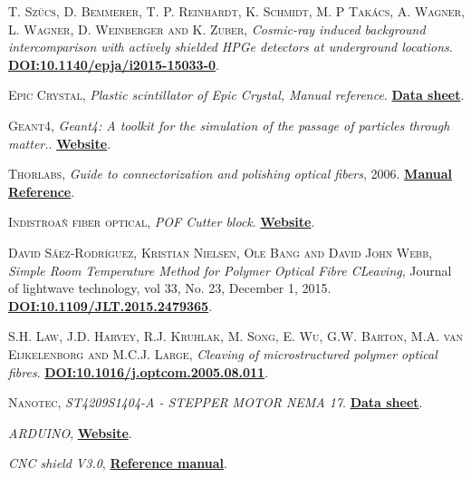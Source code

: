 \begin{thebibliography}{100}
 \textsc{T. Szücs, D. Bemmerer, T. P. Reinhardt, K. Schmidt, M. P Takács, A. Wagner, L. Wagner, D. Weinberger and K. Zuber},
\textit{Cosmic-ray induced background intercomparison with actively shielded HPGe detectors at underground locations}. \href{https://arxiv.org/abs/1503.00457v2}{\textbf{DOI:10.1140/epja/i2015-15033-0}}.

 \textsc{Epic Crystal},
\textit{Plastic scintillator of Epic Crystal, Manual reference}. \href{http://www.epic-crystal.com/others/plastic-scintillator.html}{\textbf{Data sheet}}.

 \textsc{Geant4},
\textit{Geant4: A toolkit for the simulation of the passage of particles through matter.}. \href{https://geant4.web.cern.ch/node/1}{\textbf{Website}}.

 \textsc{Thorlabs},
\textit{Guide to connectorization and polishing optical fibers}, 2006. \href{https://www.thorlabs.de/thorproduct.cfm?partnumber=FN96A}{\textbf{Manual Reference}}.

 \textsc{Indistroañ fiber optical},
\textit{POF Cutter block}. \href{https://i-fiberoptics.com/tool-detail.php?id=105&cat=cutters}{\textbf{Website}}.

 \textsc{David Sáez-Rodríguez, Kristian Nielsen, Ole Bang and David John Webb},
\textit{Simple Room Temperature Method for Polymer Optical Fibre CLeaving}, Journal of lightwave technology, vol 33, No. 23, December 1, 2015. \href{https://ieeexplore.ieee.org/document/7274313}{\textbf{DOI:10.1109/JLT.2015.2479365}}.

 \textsc{S.H. Law, J.D. Harvey, R.J. Kruhlak, M. Song, E. Wu, G.W. Barton, M.A. van Eijkelenborg and M.C.J. Large},
\textit{Cleaving of microstructured polymer optical fibres}. \href{https://www.researchgate.net/publication/228880071_Cleaving_of_microstructured_polymer_optical_fibres}{\textbf{DOI:10.1016/j.optcom.2005.08.011}}.

 \textsc{Nanotec},
\textit{ST4209S1404-A - STEPPER MOTOR NEMA 17}. \href{https://en.nanotec.com/products/463-st4209s1404-a}{\textbf{Data sheet}}.

\textit{ARDUINO}, \href{https://www.arduino.cc/}{\textbf{Website}}.

\textit{CNC shield V3.0}, \href{https://osoyoo.com/2017/04/07/arduino-uno-cnc-shield-v3-0-a4988/}{\textbf{Reference manual}}.


\end{thebibliography}
